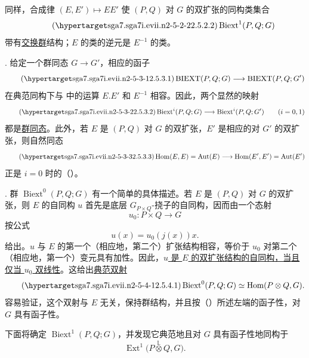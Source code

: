 同样，合成律 $(E,E')\mapsto EE'$ 使 $(P,Q)$ 对 $G$ 的双扩张的同构类集合
\begin{equation}\tag{\SGARefTarget{sga7.sga7i.evii.n2-5-2-2}{2.5.2.2}}
 \operatorname{Biext}^{1}(P,Q;G)
\end{equation}
带有\underline{交换群}结构；$E$ 的类的逆元是 $E^{-1}$ 的类。

. 给定一个群同态 $G\longrightarrow G'$，相应的函子
\begin{equation}\tag{\SGARefTarget{sga7.sga7i.evii.n2-5-3-1}{2.5.3.1}}
 \operatorname{BIEXT}(P,Q;G)
 \longrightarrow
 \operatorname{BIEXT}(P,Q;G')
\end{equation}
在典范同构下与  中的运算 $E.E'$ 和 $E^{-1}$ 相容。因此，两个显然的映射
\begin{equation}\tag{\SGARefTarget{sga7.sga7i.evii.n2-5-3-2}{2.5.3.2}}
 \operatorname{Biext}^{i}(P,Q;G)
 \longrightarrow
 \operatorname{Biext}^{i}(P,Q;G')
 \qquad(i=0,1)
\end{equation}
都是\underline{群同态}。此外，若 $E$ 是 $(P,Q)$ 对 $G$ 的双扩张，$E'$ 是相应的对 $G'$ 的双扩张，则自然同态
\begin{equation}\tag{\SGARefTarget{sga7.sga7i.evii.n2-5-3-3}{2.5.3.3}}
 \operatorname{Hom}(E,E)=\operatorname{Aut}(E)
 \longrightarrow
 \operatorname{Hom}(E',E')=\operatorname{Aut}(E')
\end{equation}
正是 $i=0$ 时的（）。

. 群 $\operatorname{Biext}^{0}(P,Q;G)$ 有一个简单的具体描述。若 $E$ 是 $(P,Q)$ 对 $G$ 的双扩张，则 $E$ 的自同构 $u$ 首先是底层 $G_{P\times Q}$-挠子的自同构，因而由一个态射
\[
 u_0:P\times Q\longrightarrow G
\]
按公式
\[
 u(x)=u_0(j(x))x.
\]
给出。$u$ 与 $E$ 的第一个（相应地，第二个）扩张结构相容，等价于 $u_0$ 对第二个（相应地，第一个）变元具有加性。因此，\underline{$u$ 是 $E$ 的双扩张结构的自同构，当且仅当 $u_0$ 双线性}。这给出\underline{典范双射}
\begin{equation}\tag{\SGARefTarget{sga7.sga7i.evii.n2-5-4-1}{2.5.4.1}}
 \operatorname{Biext}^{0}(P,Q;G)
 \simeq
 \operatorname{Hom}(P\otimes Q,G).
\end{equation}
容易验证，这个双射与 $E$ 无关，保持群结构，并且按（）所述左端的函子性，对 $G$ 具有函子性。

下面将确定 $\operatorname{Biext}^{1}(P,Q;G)$，并发现它典范地且对 $G$ 具有函子性地同构于
\[
 \operatorname{Ext}^{1}
 \bigl(P\overset{\mathbb L}{\otimes}Q,G\bigr).
\]



